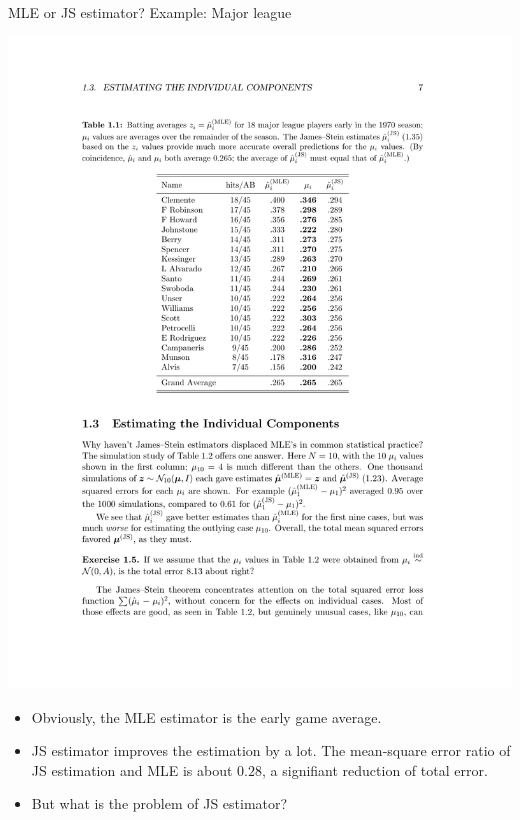 \documentclass{beamer}
\begin{document}
\begin{frame}{MLE or JS estimator? Example: Major league}
	\begin{minipage}{.48\textwidth}
		\noindent\hspace{-0.6cm}
		\includegraphics[height=0.8\textheight]{figures/JS_better}
	\end{minipage}%
	\begin{minipage}{.55\textwidth}
		\begin{itemize}
			\item
				Obviously, the MLE estimator is the early game average.
			\item
				JS estimator improves the estimation by a lot.
				The mean-square error ratio of JS estimation and MLE is
				about $0.28$, a signifiant reduction of total error.
			\item
				But what is the problem of JS estimator?
		\end{itemize}
	\end{minipage}
\end{frame}
\end{document}
